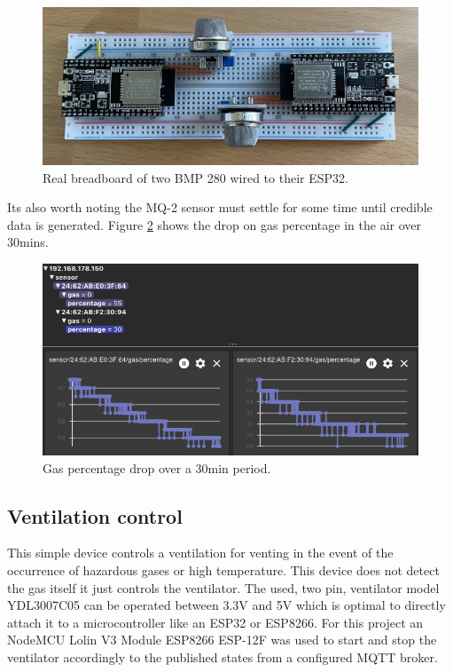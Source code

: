 \begin{figure}[H]
    \centering
    \includegraphics[width=\textwidth]{assets/setup/mq-2.jpeg}
    \caption{Real breadboard of two BMP 280 wired to their ESP32.}\label{fig:mq-2}
\end{figure}

Its also worth noting the MQ-2 sensor must settle for some time until credible data is generated. Figure \ref{fig:mq-2-percent-drop} shows the drop on gas percentage in the air over 30mins.

\begin{figure}[H]
    \centering
    \includegraphics[width=\textwidth]{assets/setup/mq-2-percent-drop.png}
    \caption{Gas percentage drop over a 30min period.}\label{fig:mq-2-percent-drop}
\end{figure}


\subsection{Ventilation control}\label{subsec:ventilation}
This simple device controls a ventilation for venting in the event of the occurrence of hazardous gases or high temperature. This device does not detect the gas itself it just controls the ventilator. The used, two pin, ventilator model YDL3007C05 can be operated between 3.3V and 5V which is optimal to directly attach it to a microcontroller like an ESP32 or ESP8266. For this project an NodeMCU Lolin V3 Module ESP8266 ESP-12F \cite{Az-delivery-ESP8266} was used to start and stop the ventilator accordingly to the published states from a configured MQTT broker.

